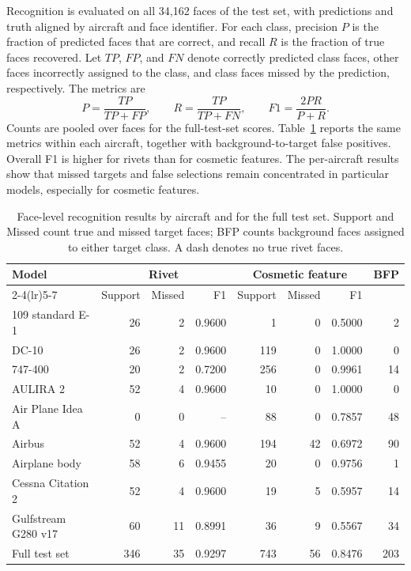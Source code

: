 \documentclass[12pt,a4paper]{article}
\begin{document}
Recognition is evaluated on all 34,162 faces of the test set, with predictions and truth aligned by aircraft and face identifier. For each class, precision $P$ is the fraction of predicted faces that are correct, and recall $R$ is the fraction of true faces recovered. Let $TP$, $FP$, and $FN$ denote correctly predicted class faces, other faces incorrectly assigned to the class, and class faces missed by the prediction, respectively. The metrics are
\begin{equation}
P=\frac{TP}{TP+FP},\qquad R=\frac{TP}{TP+FN},\qquad
F1=\frac{2PR}{P+R}.
\label{eq:recognition_metrics}
\end{equation}
Counts are pooled over faces for the full-test-set scores. Table~\ref{tab:e1_class_metrics} reports the same metrics within each aircraft, together with background-to-target false positives. Overall F1 is higher for rivets than for cosmetic features. The per-aircraft results show that missed targets and false selections remain concentrated in particular models, especially for cosmetic features.

\begin{table}[!ht]
\centering
\singlespacing
\footnotesize
\captionsetup{font=footnotesize,skip=3pt}
\caption{Face-level recognition results by aircraft and for the full test set. Support and Missed count true and missed target faces; BFP counts background faces assigned to either target class. A dash denotes no true rivet faces.}\label{tab:e1_class_metrics}
\begin{tabular*}{\linewidth}{@{\extracolsep{\fill}}lrrrrrrr@{}}
\toprule
\multirow[c]{2}{*}[-0.5ex]{Model} & \multicolumn{3}{c}{Rivet} & \multicolumn{3}{c}{Cosmetic feature} & \multirow[c]{2}{*}[-0.5ex]{BFP} \\
\cmidrule(lr){2-4}\cmidrule(lr){5-7}
 & Support & Missed & F1 & Support & Missed & F1 & \\
\midrule
109 standard E-1 & 26 & 2 & 0.9600 & 1 & 0 & 0.5000 & 2 \\
DC-10 & 26 & 2 & 0.9600 & 119 & 0 & 1.0000 & 0 \\
747-400 & 20 & 2 & 0.7200 & 256 & 0 & 0.9961 & 14 \\
AULIRA 2 & 52 & 4 & 0.9600 & 10 & 0 & 1.0000 & 0 \\
Air Plane Idea A & 0 & 0 & -- & 88 & 0 & 0.7857 & 48 \\
Airbus & 52 & 4 & 0.9600 & 194 & 42 & 0.6972 & 90 \\
Airplane body & 58 & 6 & 0.9455 & 20 & 0 & 0.9756 & 1 \\
Cessna Citation 2 & 52 & 4 & 0.9600 & 19 & 5 & 0.5957 & 14 \\
Gulfstream G280 v17 & 60 & 11 & 0.8991 & 36 & 9 & 0.5567 & 34 \\
\midrule
Full test set & 346 & 35 & 0.9297 & 743 & 56 & 0.8476 & 203 \\
\bottomrule
\end{tabular*}
\end{table}
\end{document}

